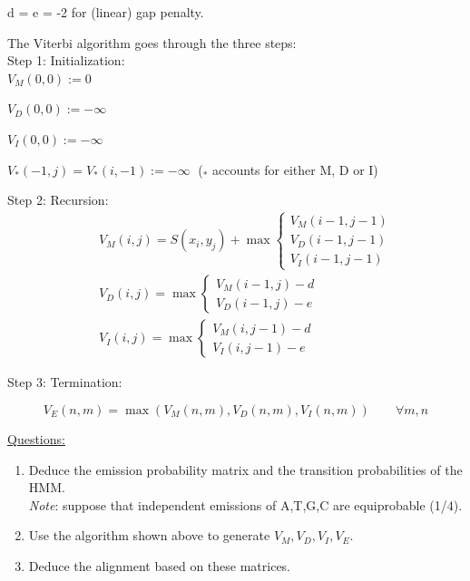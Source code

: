 \documentclass[a4paper,11pt]{article}
\begin{document}
d = e = -2 for (linear) gap penalty.

\newpage
The Viterbi algorithm goes through the three steps:\\


Step 1: Initialization:\\

$V_M(0,0):=0$

$V_D(0,0):=-\infty$

$V_I(0,0):=-\infty$

$V_*(-1,j)=V_*(i,-1):=-\infty \;$ ($_*$ accounts for either M, D or I)
\vspace{0.5cm}

Step 2: Recursion:
\begin{eqnarray}
&&
V_M(i,j) =S(x_{i},y_{j})+\max 
	\left\{ \begin{array}{l}
	 V_M(i-1,j-1) \\
     V_D(i-1,j-1) \\
     V_I(i-1,j-1)
    \end{array} \right.\nonumber\\
&&
V_D(i,j) =\max \left\{ 
    \begin{array}{ll}
     V_M(i-1,j)-d \\
     V_D(i-1,j)-e 
    \end{array} \right.\nonumber\\
&&
V_I(i,j) =\max \left\{ 
    \begin{array}{ll}
     V_M(i,j-1)-d\\
     V_I(i,j-1)-e
    \end{array} \right.\nonumber
\end{eqnarray}


Step 3: Termination:

$$V_E(n,m)=\max(V_M(n,m),V_D(n,m),V_I(n,m)) \qquad \forall m,n$$

\underline{Questions:}
\begin{enumerate}
\item Deduce the emission probability matrix and the transition probabilities of the HMM.\\
	\textit{Note}: suppose that independent emissions of A,T,G,C are equiprobable (1/4).
\item Use the algorithm shown above to generate $V_M, V_D, V_I, V_E$.
\item Deduce the alignment based on these matrices.
\end{enumerate}

\newpage
\end{document}
